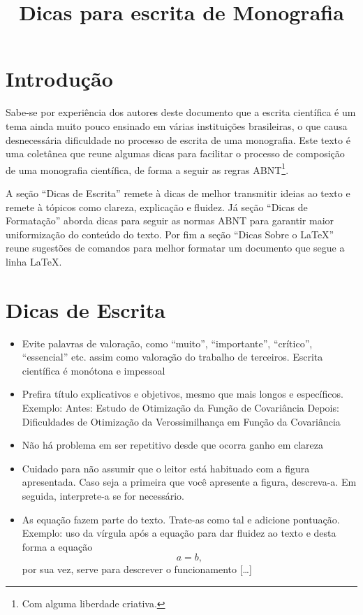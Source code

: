 \documentclass{article}
\title{Dicas para escrita de Monografia}
\date{}
\begin{document}
\maketitle
\section{Introdução} \label{sec:intro}

Sabe-se por experiência dos autores deste documento que a escrita científica é um tema ainda muito pouco ensinado em várias instituições brasileiras, o que causa desnecessária dificuldade no processo de escrita de uma monografia. Este texto é uma coletânea que reune algumas dicas para facilitar o processo de composição de uma monografia científica, de forma a seguir as regras ABNT\footnote{Com alguma liberdade criativa.}. 

A seção ``Dicas de Escrita'' remete à dicas de melhor transmitir ideias ao texto e remete à tópicos como clareza, explicação e fluidez. Já seção ``Dicas de Formatação'' aborda dicas para seguir as normas ABNT para garantir maior uniformização do conteúdo do texto. Por fim a seção ``Dicas Sobre o \LaTeX'' reune sugestões de comandos para melhor formatar um documento que segue a linha \LaTeX.

\pagebreak

\section{Dicas de Escrita} \label{sec:dicas_escrita}

\begin{itemize}
  \item Evite palavras de valoração, como ``muito'', ``importante'', ``crítico'', ``essencial'' etc. assim como valoração do trabalho de terceiros. Escrita científica é monótona e impessoal
  \item Prefira título explicativos e objetivos, mesmo que mais longos e específicos. Exemplo:
    \subitem Antes: Estudo de Otimização da Função de Covariância
    \subitem Depois:  Dificuldades de Otimização da Verossimilhança em Função da Covariância
  \item Não há problema em ser repetitivo desde que ocorra ganho em clareza
  \item Cuidado para não assumir que o leitor está habituado com a figura apresentada. Caso seja a primeira que você apresente a figura, descreva-a. Em seguida, interprete-a se for necessário.
  \item As equação fazem parte do texto. Trate-as como tal e adicione pontuação. 
    \subitem Exemplo: uso da vírgula após a equação para dar fluidez ao texto
    \subitem [\dots] e desta forma a equação $$a = b,$$ por sua vez, serve para descrever o funcionamento [\dots]
\end{itemize}
\end{document}
